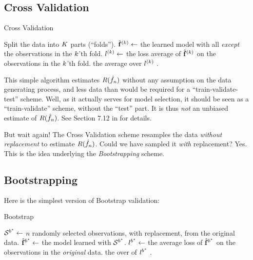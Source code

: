 \subsection{Cross Validation}
\label{sec:cv}

\begin{algorithm}[H]
\caption{Cross Validation}
\begin{algorithmic}
\State Split the data into $K$ parts (``folds'').
    \State $\hat{\mathbf{f}}^{(k)} \gets$ the learned model with all \emph{except} the observations in the $k$'th fold.
    \State $l^{(k)} \gets$ the loss average of $\hat{\mathbf{f}}^{(k)}$ on the observations in the $k$'th fold.
\EndFor
\State \Return the average over $l^{(k)}$ .
\end{algorithmic}
\end{algorithm}

This simple algorithm estimates $R(\hat{f}_n)$ without any assumption on the data generating process, and less data than would be required for a ``train-validate-test'' scheme.
Well, as it actually serves for model selection, it should be seen as a ``train-validate'' scheme, without the ``test'' part. It is thus \emph{not} an unbiased estimate of $R(\hat{f}_n)$. See Section 7.12 in \cite{hastie_elements_2003} for details.

But wait again! 
The Cross Validation scheme resamples the data \emph{without replacement} to estimate $R(\hat{f}_n)$. Could we have sampled it \emph{with} replacement? Yes. This is the idea underlying the \emph{Bootstrapping} scheme.


\subsection{Bootstrapping}
\label{sec:bootstrap}

Here is the simplest version of Bootstrap validation:

\begin{algorithm}[H]
\caption{Bootstrap}
\begin{algorithmic}
	\State $\mathcal{S}^{b^*} \gets$ $n$ randomly selected observations, with replacement, from the original data.
    \State $\hat{\mathbf{f}}^{{b^*}} \gets$ the model learned with  $\mathcal{S}^{b^*}$.
    \State $l^{{b^*}} \gets$ the average loss of $\hat{\mathbf{f}}^{{b^*}}$ on the observations in the \emph{original} data.
\EndFor
\State \Return the over of $l^{{b^*}}$ .
\end{algorithmic}
\end{algorithm}


